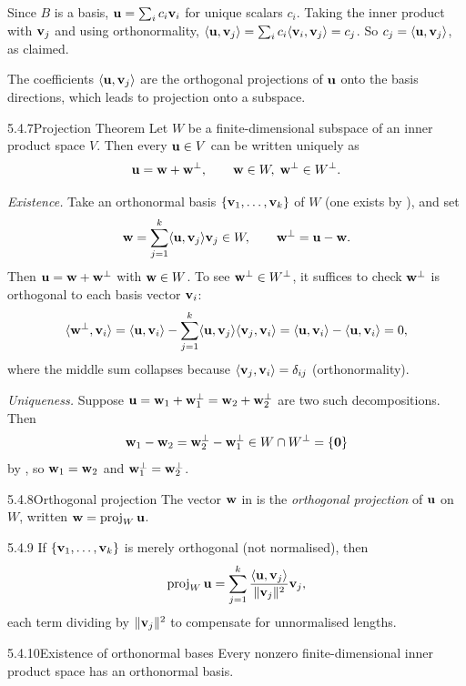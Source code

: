 \begin{prf}
Since $B$ is a basis, $\mathbf{u}=\sum_i c_i\mathbf{v}_i$ for unique scalars $c_i$. Taking the inner product with $\mathbf{v}_j$ and using orthonormality, $\langle \mathbf{u}, \mathbf{v}_j \rangle=\sum_i c_i\langle \mathbf{v}_i, \mathbf{v}_j \rangle=c_j$. So $c_j=\langle \mathbf{u}, \mathbf{v}_j \rangle$, as claimed.
\end{prf}

The coefficients $\langle \mathbf{u}, \mathbf{v}_j \rangle$ are the orthogonal projections of $\mathbf{u}$ onto the basis directions, which leads to projection onto a subspace.

\begin{thms}{5.4.7}{Projection Theorem}
Let $W$ be a finite-dimensional subspace of an inner product space $V$. Then every $\mathbf{u}\in V$ can be written uniquely as
\[
\mathbf{u}=\mathbf{w}+\mathbf{w}^\perp,\qquad \mathbf{w}\in W,\;\mathbf{w}^\perp\in W^\perp.
\]
\end{thms}

\begin{prf}
\emph{Existence.} Take an orthonormal basis $\{\mathbf{v}_1,\dots,\mathbf{v}_k\}$ of $W$ (one exists by ), and set
\[
\mathbf{w}=\sum_{j=1}^k\langle \mathbf{u}, \mathbf{v}_j \rangle\mathbf{v}_j\in W,\qquad \mathbf{w}^\perp=\mathbf{u}-\mathbf{w}.
\]
Then $\mathbf{u}=\mathbf{w}+\mathbf{w}^\perp$ with $\mathbf{w}\in W$. To see $\mathbf{w}^\perp\in W^\perp$, it suffices to check $\mathbf{w}^\perp$ is orthogonal to each basis vector $\mathbf{v}_i$:
\[
\langle \mathbf{w}^\perp, \mathbf{v}_i \rangle=\langle \mathbf{u}, \mathbf{v}_i \rangle-\sum_{j=1}^k\langle \mathbf{u}, \mathbf{v}_j \rangle\langle \mathbf{v}_j, \mathbf{v}_i \rangle=\langle \mathbf{u}, \mathbf{v}_i \rangle-\langle \mathbf{u}, \mathbf{v}_i \rangle=0,
\]
where the middle sum collapses because $\langle \mathbf{v}_j, \mathbf{v}_i \rangle=\delta_{ij}$ (orthonormality).

\emph{Uniqueness.} Suppose $\mathbf{u}=\mathbf{w}_1+\mathbf{w}_1^\perp=\mathbf{w}_2+\mathbf{w}_2^\perp$ are two such decompositions. Then
\[
\mathbf{w}_1-\mathbf{w}_2=\mathbf{w}_2^\perp-\mathbf{w}_1^\perp\in W\cap W^\perp=\{\mathbf{0}\}
\]
by , so $\mathbf{w}_1=\mathbf{w}_2$ and $\mathbf{w}_1^\perp=\mathbf{w}_2^\perp$.
\end{prf}

\begin{defns}{5.4.8}{Orthogonal projection}
The vector $\mathbf{w}$ in  is the \emph{orthogonal projection} of $\mathbf{u}$ on $W$, written $\mathbf{w}=\operatorname{proj}_W\mathbf{u}$.
\end{defns}

\begin{rmks}{5.4.9}
If $\{\mathbf{v}_1,\dots,\mathbf{v}_k\}$ is merely orthogonal (not normalised), then
\[
\operatorname{proj}_W\mathbf{u}=\sum_{j=1}^k\frac{\langle \mathbf{u}, \mathbf{v}_j \rangle}{\lVert \mathbf{v}_j \rVert^2}\mathbf{v}_j,
\]
each term dividing by $\lVert \mathbf{v}_j \rVert^2$ to compensate for unnormalised lengths.
\end{rmks}

\begin{thms}{5.4.10}{Existence of orthonormal bases}
Every nonzero finite-dimensional inner product space has an orthonormal basis.
\end{thms}

